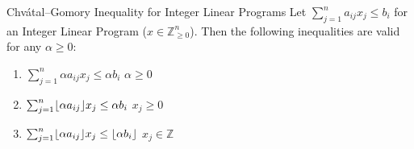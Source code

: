 %
%
%
%

\begin{frame}{Chvátal–Gomory Inequality for Integer Linear Programs}
Let $\sum_{j=1}^n a_{ij} x_j \leq b_i$ for an Integer Linear Program ($x \in \mathbb{Z}_{\geq 0}^n$).
Then the following inequalities are valid for any $\alpha \geq 0$:
\begin{enumerate}[<+->]
	\item $\sum_{j=1}^n \alpha a_{ij} x_j \leq \alpha b_i$ \hfill $\alpha \geq 0$
	\item $\sum_{j=1}^n \lfloor\alpha a_{ij}\rfloor x_j \leq \alpha b_i$ \hfill $x_j \geq 0$
	\item $\sum_{j=1}^n \lfloor\alpha a_{ij}\rfloor x_j \leq \lfloor \alpha b_i\rfloor$ \hfill $x_j \in \mathbb{Z}$
\end{enumerate}

\end{frame}

